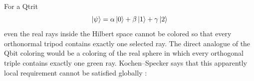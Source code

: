For a Qtrit
\[
\ket\psi=\alpha\ket0+\beta\ket1+\gamma\ket2
\]
even the real rays inside the Hilbert space cannot be colored so that every orthonormal tripod contains exactly one selected ray.
The direct analogue of the Qbit coloring would be a coloring of the real sphere in which every orthogonal triple contains exactly one green ray.
Kochen--Specker says that this apparently local requirement cannot be satisfied globally
\cite{kochenSpeckerHiddenVariables}:


